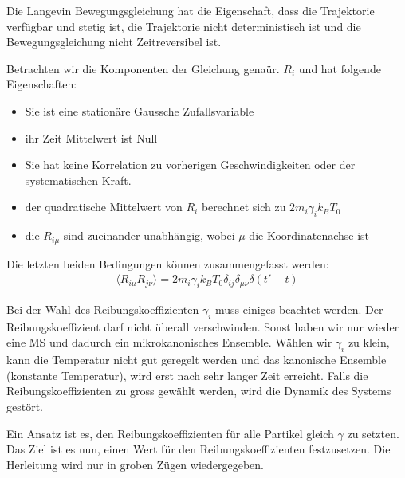 \documentclass[]{article}
\begin{document}
Die Langevin Bewegungsgleichung hat  die Eigenschaft, dass die Trajektorie verfügbar und stetig ist, die Trajektorie nicht deterministisch ist und die Bewegungsgleichung nicht Zeitreversibel ist. 


Betrachten wir die Komponenten der Gleichung genaür.
$R_i$ und hat folgende Eigenschaften: 
\begin{itemize}
	\item Sie ist eine stationäre Gaussche Zufallsvariable %
	\item ihr Zeit Mittelwert ist Null %
	\item Sie hat keine Korrelation zu vorherigen Geschwindigkeiten oder der systematischen Kraft. 
	\item der quadratische Mittelwert von $R_i$ berechnet sich zu $2 m_i \gamma_i k_B T_0$
	\item die $R_{i \mu}$ sind zueinander unabhängig, wobei $\mu$ die Koordinatenachse ist %
\end{itemize}
Die letzten beiden Bedingungen können zusammengefasst werden: 
\begin{align*}
	\langle R_{i \mu} R_{j \nu } \rangle = 2 m_i \gamma_i k_B T_0 \delta_{ij} \delta_{\mu \nu} \delta(t' - t)
\end{align*}

Bei der Wahl des Reibungskoeffizienten $\gamma_i$ muss einiges beachtet werden. Der Reibungskoeffizient darf nicht überall verschwinden. Sonst haben wir nur wieder eine MS und dadurch ein mikrokanonisches Ensemble. Wählen wir $\gamma_i$ zu klein, kann die Temperatur nicht gut geregelt werden und das kanonische Ensemble (konstante Temperatur), wird erst nach sehr langer Zeit erreicht. Falls die Reibungskoeffizienten zu gross gewählt werden, wird die Dynamik des Systems gestört. 

Ein Ansatz ist es, den Reibungskoeffizienten für alle Partikel gleich $\gamma$ zu setzten. Das Ziel ist es nun, einen Wert für den Reibungskoeffizienten festzusetzen. Die Herleitung wird nur in groben Zügen wiedergegeben. 
\end{document}
